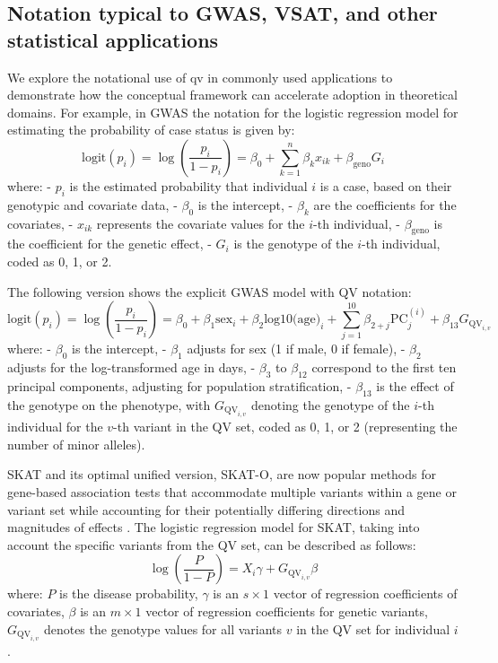 \subsection{Notation typical to GWAS, VSAT, and other statistical applications}
We explore the notational use of \ac{qv} in commonly used applications to demonstrate how the conceptual framework can accelerate adoption in theoretical domains. 
For example, in GWAS \cite{uffelmann2021genome} the notation for the logistic regression model for estimating the probability of case status is given by:
$$
\text{logit}(p_i) = \log\left(\frac{p_i}{1 - p_i}\right) = \beta_0 + \sum_{k=1}^n \beta_k x_{ik} + \beta_{\text{geno}} G_i
$$
where:
- \( p_i \) is the estimated probability that individual \( i \) is a case, based on their genotypic and covariate data,
- \( \beta_0 \) is the intercept,
- \( \beta_k \) are the coefficients for the covariates,
- \( x_{ik} \) represents the covariate values for the \( i \)-th individual,
- \( \beta_{\text{geno}} \) is the coefficient for the genetic effect,
- \( G_i \) is the genotype of the \( i \)-th individual, coded as 0, 1, or 2.

The following version shows the explicit GWAS model with QV notation:
$$
\text{logit}(p_i) = \log\left(\frac{p_i}{1 - p_i}\right) = \beta_0 + \beta_1 \text{sex}_i + \beta_2 \text{log10(age)}_i + \sum_{j=1}^{10} \beta_{2+j} \text{PC}_j^{(i)} + \beta_{13} G_{\text{QV}_{i,v}}
$$
where:
- \( \beta_0 \) is the intercept,
- \( \beta_1 \) adjusts for sex (1 if male, 0 if female),
- \( \beta_2 \) adjusts for the log-transformed age in days,
- \( \beta_3 \) to \( \beta_{12} \) correspond to the first ten principal components, adjusting for population stratification,
- \( \beta_{13} \) is the effect of the genotype on the phenotype, with \( G_{\text{QV}_{i,v}} \) denoting the genotype of the \( i \)-th individual for the \( v \)-th variant in the QV set, coded as 0, 1, or 2 (representing the number of minor alleles).


SKAT and its optimal unified version, SKAT-O, are now popular methods for gene-based association tests that accommodate multiple variants within a gene or variant set while accounting for their potentially differing directions and magnitudes of effects
\cite{wu2011rare, lee2012optimal}. 
The logistic regression model for SKAT, taking into account the specific variants from the QV set, can be described as follows:
$$
\log \left( \frac{P}{1-P} \right) = X_i \gamma + G_{\text{QV}_{i,v}} \beta
$$
where:
\( P \) is the disease probability,
\( \gamma \) is an \( s \times 1 \) vector of regression coefficients of covariates,
\( \beta \) is an \( m \times 1 \) vector of regression coefficients for genetic variants,
\( G_{\text{QV}_{i,v}} \) denotes the genotype values for all variants \( v \) in the QV set for individual \( i \).

